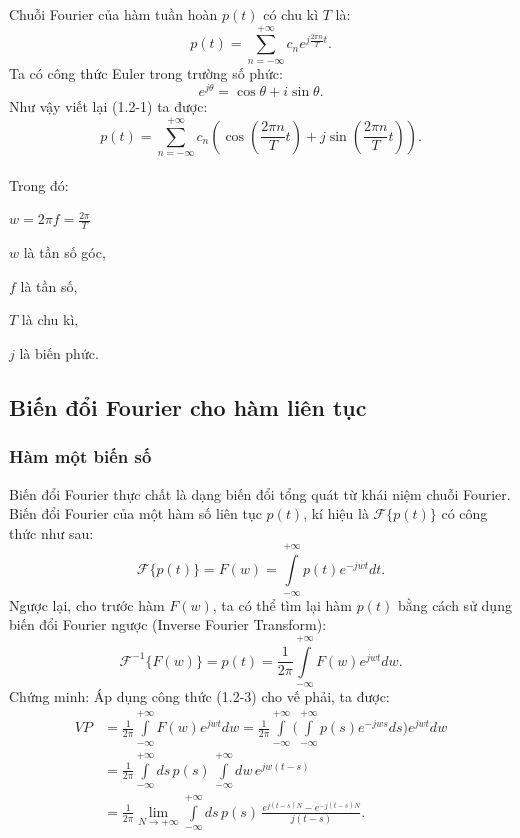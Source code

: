 Chuỗi Fourier của hàm tuần hoàn $p(t)$ có chu kì $T$ là:
\begin{equation}
  p(t) = \sum\limits_{n =  - \infty }^{ + \infty } {{c_n}{e^{j\frac{{2\pi n}}{T}t}}}. \tag{1.2-1}  
\end{equation}
Ta có công thức Euler trong trường số phức:
\begin{equation}
{e^{j\theta }} = \cos \theta  + i\sin \theta. \tag{1.2-2}
\end{equation}
Như vậy viết lại (1.2-1) ta được:
$$p(t) = \sum\limits_{n =  - \infty }^{ + \infty } {{c_n}(\cos (\frac{{2\pi n}}{T}t) + j\sin (\frac{{2\pi n}}{T}t))}.$$
\\
Trong đó:
\par $w=2\pi f=\frac{2\pi}{T}$
\par $w$ là tần số góc,
\par $f$ là tần số,
\par $T$ là chu kì,
\par $j$ là biến phức.

\subsection{Biến đổi Fourier cho hàm liên tục}
\subsubsection{Hàm một biến số}
Biến đổi Fourier thực chất là dạng biến đổi tổng quát từ khái niệm chuỗi Fourier.
Biến đổi Fourier của một hàm số liên tục $p(t)$, kí hiệu là $\mathcal{F} \{p(t)\}$ có công thức như sau:
\begin{equation}
\mathcal{F} \{p(t)\} = 
F(w ) = \int\limits_{ - \infty }^{ + \infty } {p(t){e^{ - jwt}}dt}.\tag{1.2-3}
\end{equation}
Ngược lại, cho trước hàm $F(w)$, ta có thể tìm lại hàm $p(t)$ bằng cách sử dụng biến đổi Fourier ngược (Inverse Fourier Transform):
\begin{equation}
\mathcal{F} ^{-1}\{F(w)\} = p(t) = \frac{1}{2\pi}\int\limits_{ - \infty }^{ + \infty } {F(w){e^{jwt}}dw} .\tag{1.2-4}
\end{equation}
Chứng minh:
Áp dụng công thức (1.2-3) cho vế phải, ta được:
\begin{equation*}
	\begin{split}
    VP & = \frac{1}{2\pi}\int\limits_{ - \infty }^{ + \infty } {F(w){e^{jwt}}dw} = \frac{1}{{2\pi }}\int\limits_{ - \infty }^{ + \infty } {(\int\limits_{ - \infty }^{ + \infty } {p(s){e^{ - jws}}ds){e^{jwt}}dw } } \\
    & = \frac{1}{{2\pi }}\int\limits_{ - \infty }^{ + \infty } {ds\,p(s)\,\int\limits_{ - \infty }^{ + \infty } {dw\,{e^{jw(t - s)}}} } \\
    & =\frac{1}{{2\pi }}\mathop {\lim }\limits_{N \to  + \infty } \int\limits_{ - \infty }^{ + \infty } {ds\,p(s)\,\frac{{{e^{j(t - s)N}} - {e^{ - j(t - s)N}}}}{{j(t - s)}}}.
	\end{split}
\end{equation*}


